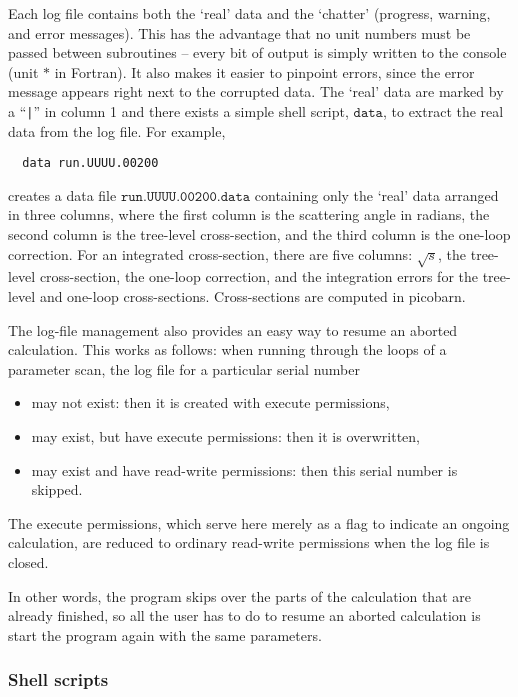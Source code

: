 \documentclass[twoside,11pt]{article}
\makeatletter
\def\indextt#1{\index{#1@\texttt{#1}}}
\def\Code#1{\ensuremath{\texttt{#1}}}
\makeatother
\begin{document}
Each log file contains both the `real' data and the `chatter' (progress,
warning, and error messages).  This has the advantage that no unit
numbers must be passed between subroutines -- every bit of output is
simply written to the console (unit \Code{*} in Fortran).  It also makes
it easier to pinpoint errors, since the error message appears right next
to the corrupted data.  The `real' data are marked by a ``\verb=|='' in
column 1 and there exists a simple shell script, \Code{data}, to extract
the real data from the log file.  For example,
\begin{verbatim}
  data run.UUUU.00200
\end{verbatim}
creates a data file \Code{run.UUUU.00200.data} containing only the
`real' data arranged in three columns, where the first column is the
scattering angle in radians, the second column is the tree-level
cross-section, and the third column is the one-loop correction.  For an
integrated cross-section, there are five columns: $\sqrt s$, the
tree-level cross-section, the one-loop correction, and the integration
errors for the tree-level and one-loop cross-sections.  Cross-sections 
are computed in picobarn.%
\indextt{data}

The log-file management also provides an easy way to resume an aborted
calculation.  This works as follows: when running through the loops of a
parameter scan, the log file for a particular serial number
\begin{itemize}
\item may not exist:
      then it is created with execute permissions,
\item may exist, but have execute permissions:
      then it is overwritten,
\item may exist and have read-write permissions:
      then this serial number is skipped.
\end{itemize}
The execute permissions, which serve here merely as a flag to indicate
an ongoing calculation, are reduced to ordinary read-write permissions
when the log file is closed.%

In other words, the program skips over the parts of the calculation that
are already finished, so all the user has to do to resume an aborted 
calculation is start the program again with the same parameters.


\subsubsection{Shell scripts}
\end{document}
